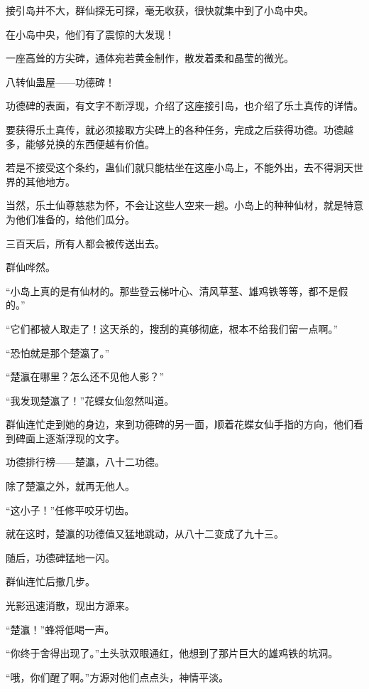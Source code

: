 
\begin{this_body}



接引岛并不大，群仙探无可探，毫无收获，很快就集中到了小岛中央。

在小岛中央，他们有了震惊的大发现！

一座高耸的方尖碑，通体宛若黄金制作，散发着柔和晶莹的微光。

八转仙蛊屋——功德碑！

功德碑的表面，有文字不断浮现，介绍了这座接引岛，也介绍了乐土真传的详情。

要获得乐土真传，就必须接取方尖碑上的各种任务，完成之后获得功德。功德越多，能够兑换的东西便越有价值。

若是不接受这个条约，蛊仙们就只能枯坐在这座小岛上，不能外出，去不得洞天世界的其他地方。

当然，乐土仙尊慈悲为怀，不会让这些人空来一趟。小岛上的种种仙材，就是特意为他们准备的，给他们瓜分。

三百天后，所有人都会被传送出去。

群仙哗然。

“小岛上真的是有仙材的。那些登云梯叶心、清风草茎、雄鸡铁等等，都不是假的。”

“它们都被人取走了！这天杀的，搜刮的真够彻底，根本不给我们留一点啊。”

“恐怕就是那个楚瀛了。”

“楚瀛在哪里？怎么还不见他人影？”

“我发现楚瀛了！”花蝶女仙忽然叫道。

群仙连忙走到她的身边，来到功德碑的另一面，顺着花蝶女仙手指的方向，他们看到碑面上逐渐浮现的文字。

功德排行榜——楚瀛，八十二功德。

除了楚瀛之外，就再无他人。

“这小子！”任修平咬牙切齿。

就在这时，楚瀛的功德值又猛地跳动，从八十二变成了九十三。

随后，功德碑猛地一闪。

群仙连忙后撤几步。

光影迅速消散，现出方源来。

“楚瀛！”蜂将低喝一声。

“你终于舍得出现了。”土头驮双眼通红，他想到了那片巨大的雄鸡铁的坑洞。

“哦，你们醒了啊。”方源对他们点点头，神情平淡。


\end{this_body}
